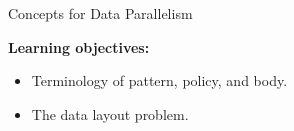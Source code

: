 
\begin{frame}[fragile]{}

  {\Huge Concepts for Data Parallelism} 

  \vspace{20pt}

  \textbf{Learning objectives:}
  \begin{itemize}
    \item{Terminology of pattern, policy, and body.}
    \item{The data layout problem.}
  \end{itemize}

  \vspace{-20pt}

\end{frame}


